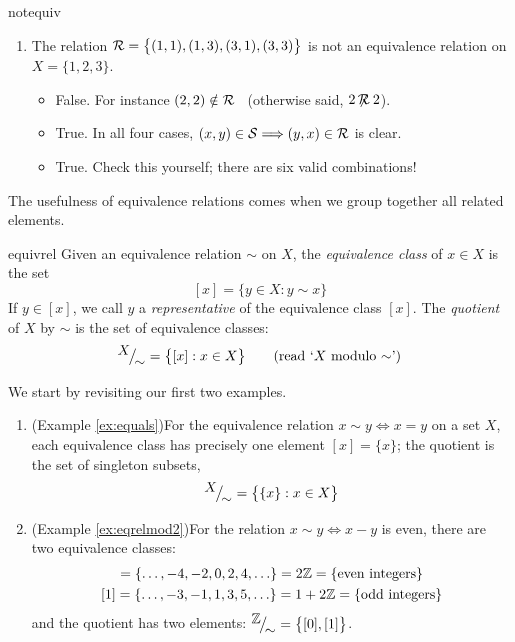 \begin{examples}{}{notequiv}
\begin{enumerate}
		\item\label{ex:notequiv3} The relation $\mathcal{R}=\bigl\{(1,1),(1,3),(3,1),(3,3)\bigr\}$ is not an equivalence relation on $X=\{1,2,3\}$.
		\begin{itemize}
			\item[] False. For instance $(2,2)\notin\mathcal{R}$ \ (otherwise said, $2\mathbin{\not\!\!\mathcal{R}} 2$).
			\item[]\eqsymm True. In all four cases, $(x,y)\in\mathcal{S}\Longrightarrow (y,x)\in\mathcal{R}$ is clear.
			\item[]\eqtrans True. Check this yourself; there are six valid combinations!
		\end{itemize} 
	\end{enumerate}
\end{examples}


The usefulness of equivalence relations comes when we group together all related elements.

\begin{defn}{}{equivrel}
	Given an equivalence relation $\sim$ on $X$, the \emph{equivalence class} of $x\in X$ is the set
	\[
		[x]=\{y\in X:y\sim x\} \tag{$y\in [x]\Longleftrightarrow y\sim x$}
	\]
	If $y\in[x]$, we call $y$ a \emph{representative} of the equivalence class $[x]$. The \emph{quotient} of $X$ by $\sim$ is the set of equivalence classes:
	\[
		{}^{\textstyle {X}}\!\big/_{\textstyle \!{\sim}}=\bigl\{[x]:x\in X\bigr\} \tag{read `$X$ modulo $\sim$'}
	\]
\end{defn}

\begin{examples}{}{}
	We start by revisiting our first two examples.
	\begin{enumerate}
	  \item (Example \ref{ex:equals})\lstsp For the equivalence relation $x\sim y\Longleftrightarrow x=y$ on a set $X$, each equivalence class has precisely one element $[x]=\{x\}$; the quotient is the set of singleton subsets,
	  \[
	  	{}^{\textstyle {X}}\!\big/_{\textstyle \!{\sim}}=\bigl\{\{x\}:x\in X\bigr\}
	  \]
	  \item (Example \ref{ex:eqrelmod2})\lstsp For the relation $x\sim y\Longleftrightarrow x-y$ is even, there are two equivalence classes:
	  \begin{gather*}
	  	[0]=\{\ldots,-4,-2,0,2,4,\ldots\}=2\Z=\{\text{even integers}\}\\
	  	[1]=\{\ldots,-3,-1,1,3,5,\ldots\}=1+2\Z=\{\text{odd integers}\}
	  \end{gather*}
	  and the quotient has two elements: ${}^{\textstyle {\mathbb{Z}}}\!\big/_{\textstyle \!{\sim}}=\bigl\{[0],[1]\bigr\}$.
	\end{enumerate}
\end{examples}

